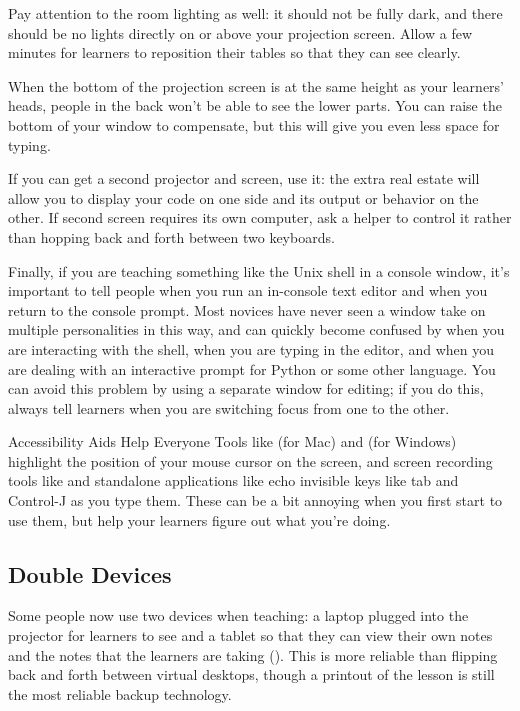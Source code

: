 Pay attention to the room lighting as well:
it should not be fully dark, and there should be no lights directly
on or above your projection screen.
Allow a few minutes for learners to reposition their tables
so that they can see clearly.

When the bottom of the projection screen is at the same height as your learners' heads,
people in the back won't be able to see the lower parts.
You can raise the bottom of your window to compensate,
but this will give you even less space for typing.

If you can get a second projector and screen,
use it:
the extra real estate will allow you to display your code on one side
and its output or behavior on the other.
If second screen requires its own computer,
ask a helper to control it
rather than hopping back and forth between two keyboards.

Finally,
if you are teaching something like the Unix shell in a console window,
it's important to tell people when you run an in-console text editor
and when you return to the console prompt.
Most novices have never seen a window take on multiple personalities in this way,
and can quickly become confused by
when you are interacting with the shell,
when you are typing in the editor,
and when you are dealing with an interactive prompt for Python or some other language.
You can avoid this problem by using a separate window for editing;
if you do this,
always tell learners when you are switching focus from one to the other.

\newpage
\begin{aside}{Accessibility Aids Help Everyone}
  Tools like  (for Mac)
  and  (for Windows)
  highlight the position of your mouse cursor on the screen,
  and screen recording tools like 
  and standalone applications like 
  echo invisible keys like tab and Control-J as you type them.
  These can be a bit annoying when you first start to use them,
  but help your learners figure out what you're doing.
\end{aside}

\subsection*{Double Devices}

Some people now use two devices when teaching:
a laptop plugged into the projector for learners to see
and a tablet so that they can view their own notes
and the notes that the learners are taking ().
This is more reliable than flipping back and forth between virtual desktops,
though a printout of the lesson is still the most reliable backup technology.

